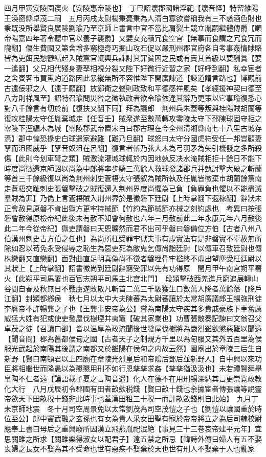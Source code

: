 四月甲寅安陵園寑火【安陵惠帝陵也】　丁巳詔壞郡國諸淫祀【壞音怪】特留雒陽王渙密縣卓茂二祠　五月丙戌太尉楊秉薨秉為人清白寡欲嘗稱我有三不惑酒色財也秉既没所舉賢良廣陵劉瑜乃至京師上書言中官不當比肩裂土競立胤嗣繼體傳爵【順帝陽嘉四年著令聽中官以養子襲爵】又嬖女充積冗食空宫【無事而食謂之冗食冗而隴翻】傷生費國又第舍增多窮極奇巧掘山攻石促以嚴刑州郡官府各自考事姦情賕賂皆為吏餌民愁鬱結起入賊黨官輒興兵誅討其罪貧困之民或有賣其首級以要酬賞【要一遙翻】父兄相代殘身妻孥相視分裂又陛下好微行近習之家【好呼到翻】私幸宦者之舍賓客市買熏灼道路因此暴縱無所不容惟陛下開廣諫道【諫道謂言路也】博觀前古遠佞邪之人【遠于願翻】放鄭衛之聲則政致和平德感祥風矣【孝經援神契曰德至八方則祥風至】詔特召瑜問災咎之徵執政者欲令瑜依違其辭乃更策以它事瑜復悉心對八千餘言有切於前【復扶又翻下同】拜為議郎　荆州兵朱蓋等叛與桂陽賊胡蘭等復攻桂陽太守任胤棄城走【任音壬】賊衆遂至數萬轉攻零陵太守下邳陳球固守拒之零陵下溼編木為城【零陵郡武帝置宋白曰郡古理在今全州清湘縣南七十八里古城存焉】郡中惶恐掾史白球遣家避難【難乃旦翻】球怒曰太守分國虎符受任一邦豈顧妻孥而沮國威乎【孥音奴沮在呂翻】復言者斬乃弦大木為弓羽矛為矢引機發之多所殺傷【此則今划車弩之類】賊激流灌城球輒於内因地埶反决水淹賊相拒十餘日不能下時度尚徵還京師詔以尚為中郎將率步騎三萬餘人救球發諸郡兵并埶討擊大破之斬蘭等首三千餘級復以尚為荆州刺史蒼梧太守張叙為賊所執及任胤皆徵棄市胡蘭餘黨南走蒼梧交趾刺史張磐擊破之賊復還入荆州界度尚懼為已負【負罪負也懼以不能盡滅羣賊為罪】乃偽上言蒼梧賊入荆州界於是徵磐下廷尉【上時掌翻下遐稼翻】辭狀未正會赦見原磐不肯出獄方更牢持械節【竹約為節械節亦械之刻約處也　考異曰按張磐會赦得原檢帝紀此後未有赦不知會何赦也六年三月赦前此二年永康元年六月赦後此二年今從帝紀】獄吏謂磐曰天恩曠然而君不出可乎磐曰磐備位方伯【古者八州八伯漢州刺史古方伯之任也】為尚所枉受罪牢獄夫事有虛實法有是非磐實不辜赦無所除如忍以苟免永受侵辱之恥生為惡吏死為敝鬼乞傳尚詣廷尉【以傳車召致廷尉也傳株戀翻又直戀翻】面對曲直足明真偽尚不徵者磐埋骨牢檻終不虛出望塵受枉廷尉以其狀上【上時掌翻】詔書徵尚到廷尉辭窮受罪以先有功得原　閏月甲午南宫朔平署火【此朔平司馬署也百官志朔平司馬主北宫北門】　段熲擊破西羌進兵窮追展轉山谷間自春及秋無日不戰虜遂敗散凡斬首二萬三千級獲生口數萬人降者萬餘落【降戶江翻】封熲都鄉侯　秋七月以太中大夫陳蕃為太尉蕃讓於太常胡廣議郎王暢㢮刑徒李膺帝不許暢龔之子也【王龔事安帝為公】嘗為南陽太守疾其多貴戚豪族下車奮厲威猛大姓有犯或使吏發屋伐樹堙井夷竈【破其家業也】功曹張敞奏記諫曰文翁召父卓茂之徒【召讀曰邵】皆以温厚為政流聞後世發屋伐樹將為嚴烈雖欲懲惡難以聞遠【聞音問】郡為舊都侯甸之國【古者天子之制規方千里以為甸服又其外五百里為侯服光武起於南陽其後謂之南都又於雒陽在侯甸之内故云然】園廟出於章陵三后生自新野【賢曰南頓君以上四廟在章陵光烈皇后和帝隂后鄧后並新野人】自中興以來功臣將相繼世而隆愚以為懇懇用刑不如行恩孳孳求姦【孳孳猶汲汲也】未若禮賢舜舉臯陶不仁者遠【論語載子夏之言陶音遥】化人在德不在用刑暢深納其言更崇寛政教化大行　八月戊辰初令郡國有田者畝歛税錢【賢曰畝十錢也余據宦者傳張讓等說靈帝歛天下田畝税十錢非此時事也蓋漢田租三十税一而計畝斂錢則自此始】　九月丁未京師地震　冬十月司空周景免以太常劉茂為司空茂愷之子也【劉愷以讓國重於時位至公】郎中竇武融之玄孫也有女為貴人采女田聖有寵於帝帝將立之為后司隸校尉應奉上書曰母后之重興廢所因漢立飛燕胤祀泯絶【事見三十三卷哀帝建平元年】宜思關雎之所求【關雎樂得淑女以配君子】遠五禁之所忌【韓詩外傳曰婦人有五不娶喪婦之長女不娶為其不受命也世有惡疾不娶棄於天也世有刑人不娶棄于人也亂家